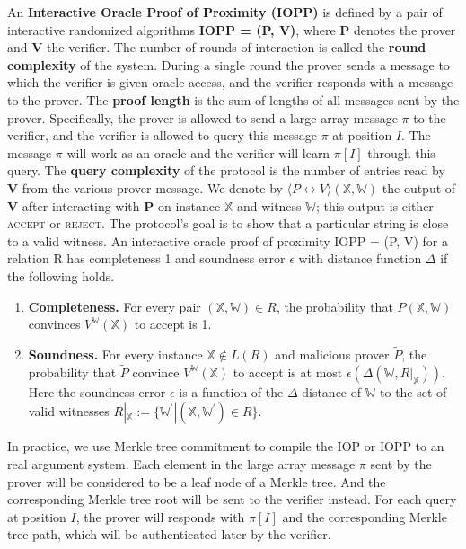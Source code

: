 \begin{definition}
An \textbf{Interactive Oracle Proof of Proximity (IOPP)} is defined by a pair of interactive randomized
algorithms \textbf{IOPP = (P, V)}, where \textbf{P} denotes the prover and \textbf{V} the verifier. 
The number of rounds of interaction is called the \textbf{round complexity} of the system. 
During a single round the prover sends a message to which the verifier is given oracle access, and the verifier responds with a message to the prover. 
The \textbf{proof length} is the sum of lengths of all messages sent by the prover. Specifically, the prover is allowed to send a large array message $\pi$ to the verifier, and the verifier is allowed to query this message $\pi$ at position $I$. The message $\pi$ will work as an oracle and the verifier will learn $\pi[I]$ through this query.
The \textbf{query complexity} of the protocol is the number of entries read by \textbf{V} from the various prover message.
We denote by $\langle P \leftrightarrow V \rangle (\mathbb{X}, \mathbb{W})$ the output of \textbf{V} after interacting with \textbf{P} on instance $\mathbb{X}$ and witness $\mathbb{W}$; this output is either \textsc{accept} or \textsc{reject}.
The protocol's goal is to show that a particular string is close to a valid witness.
An interactive oracle proof of proximity IOPP = (P, V) for a relation R has completeness 1 and soundness error $\epsilon$ with distance function $\Delta$ if the following holds.

\begin{enumerate}
    \item \textbf{Completeness.}
    For every pair $(\mathbb{X}, \mathbb{W}) \in R$, the probability that $P(\mathbb{X}, \mathbb{W})$ convinces $V^{\mathbb{W}}(\mathbb{X})$ to accept is 1.
    
    \item \textbf{Soundness.}
    For every instance $\mathbb{X} \not\in L(R)$ and malicious prover $\tilde{P}$, the probability that $\tilde{P}$ convince $V^{\mathbb{W}}(\mathbb{X})$ to accept is at most $\epsilon(\Delta(\mathbb{W}, R|_{\mathbb{X}}))$. Here the soundness error $\epsilon$ is a function of the $\Delta$-distance of $\mathbb{W}$ to the set of valid witnesses $R|_{\mathbb{X}} := \{ \mathbb{W}^\prime | (\mathbb{X}, \mathbb{W}^\prime) \in R \}$.
\end{enumerate}
\end{definition}

In practice, we use Merkle tree commitment to compile the IOP or IOPP to an real argument system. Each element in the large array message $\pi$ sent by the prover will be considered to be a leaf node of a Merkle tree. And the corresponding Merkle tree root will be sent to the verifier instead. For each query at position $I$, the prover will responds with $\pi[I]$ and the corresponding Merkle tree path, which will be authenticated later by the verifier.

